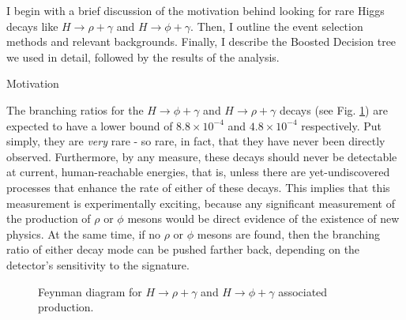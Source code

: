 %
%

I begin with a brief discussion of the motivation behind looking for rare Higgs decays like $H \rightarrow \rho+\gamma$ and $H \rightarrow \phi+\gamma$. Then, I outline the event selection methods and relevant backgrounds. Finally, I describe the Boosted Decision tree we used in detail, followed by the results of the analysis.

\begin{section}{Motivation}

The branching ratios for the $H \rightarrow \phi+\gamma$ and $H \rightarrow \rho+\gamma$ decays (see Fig. \ref{fig:whiggs}) are expected to have a lower bound of $8.8 \times 10^{-4}$ and $4.8 \times 10^{-4}$  respectively\cite{cite-rpg-brs}. Put simply, they are \textit{very} rare - so rare, in fact, that they have never been directly observed. Furthermore, by any measure, these decays should never be detectable at current, human-reachable energies, that is, unless there are yet-undiscovered processes that enhance the rate of either of these decays. This implies that this measurement is experimentally exciting, because any significant measurement of the production of $\rho$ or $\phi$ mesons would be direct evidence of the existence of new physics. At the same time, if no $\rho$ or $\phi$ mesons are found, then the branching ratio of either decay mode can be pushed farther back, depending on the detector's sensitivity to the signature.

\begin{figure}[htb]
\begin{center}

\end{center}
\caption{Feynman diagram\cite{cite-tikz-feynman} for $H \rightarrow \rho+\gamma$ and $H \rightarrow \phi+\gamma$ associated production.}
\label{fig:whiggs}
\end{figure}
\end{section}

